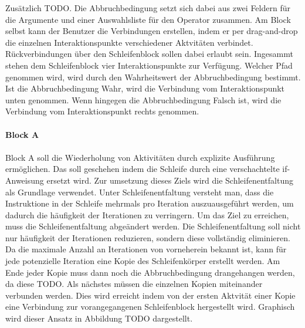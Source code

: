 \documentclass{article}
\begin{document}
    Zusätzlich TODO.
    Die Abbruchbedingung setzt sich dabei aus zwei Feldern für die Argumente und einer Auswahlsliste für den Operator zusammen.
    Am Block selbst kann der Benutzer die Verbindungen erstellen, indem er per drag-and-drop die einzelnen Interaktionspunkte verschiedener Aktvitäten verbindet.
    Rückverbindungen über den Schleifenblock sollen dabei erlaubt sein.
    Ingesammt stehen dem Schleifenblock vier Interaktionspunkte zur Verfügung.
    Welcher Pfad genommen wird, wird durch den Wahrheitswert der Abbruchbedingung bestimmt.
    Ist die Abbruchbedingung Wahr, wird die Verbindung vom Interaktionspunkt unten genommen.
    Wenn hingegen die Abbruchbedingung Falsch ist, wird die Verbindung vom Interaktionspunkt rechts genommen.\\
    \\
    \textbf{Block A}\\
    \\
    Block A soll die Wiederholung von Aktivitäten durch explizite Ausführung ermöglichen.
    Das soll geschehen indem die Schleife durch eine verschachtelte if-Anweisung ersetzt wird.
    Zur umsetzung dieses Ziels wird die Schleifenentfaltung als Grundlage verwendet.
    Unter Schleifenentfaltung versteht man, dass die Instruktione in der Schleife mehrmals pro Iteration auszuausgeführt werden, um dadurch die häufigkeit der Iterationen zu verringern. \cite{9}
    Um das Ziel zu erreichen, muss die Schleifenentfaltung abgeändert werden.
    Die Schleifenentfaltung soll nicht nur häufigkeit der Iterationen reduzieren, sondern diese vollständig eliminieren.
    Da die maximale Anzahl an Iterationen von vorneherein bekannt ist, kann für jede potenzielle Iteration eine Kopie des Schleifenkörper erstellt werden. 
    Am Ende jeder Kopie muss dann noch die Abbruchbedingung drangehangen werden, da diese TODO.
    Als nächstes müssen die einzelnen Kopien miteinander verbunden werden.
    Dies wird erreicht indem von der ersten Aktvität einer Kopie eine Verbindung zur vorangegangenen Schleifenblock hergestellt wird.
    Graphisch wird dieser Ansatz in Abbildung TODO dargestellt.\\
    \\
\end{document}

